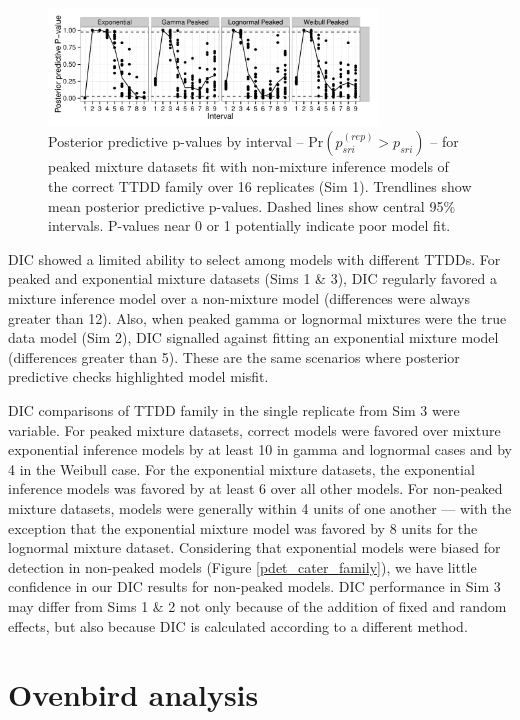 \documentclass[useAMS,usenatbib,referee,12pt]{article}
\begin{document}
\begin{figure}[h!]\centering
\includegraphics[width=0.78\textwidth]{Sims/SimZero/PostPredP_corr.pdf}
\caption{\label{postpredmix} Posterior predictive p-values by interval -- Pr$\left(p_{sri}^{(rep)} > p_{sri}\right)$ -- for peaked mixture datasets fit with non-mixture inference models of the correct TTDD family over 16 replicates (Sim 1).  Trendlines show mean posterior predictive p-values.  Dashed lines show central 95\% intervals.  P-values near 0 or 1 potentially indicate poor model fit.}
\end{figure}

DIC showed a limited ability to select among models with different TTDDs.  For peaked and exponential mixture datasets (Sims 1 \& 3), DIC regularly favored a mixture inference model over a non-mixture model (differences were always greater than 12).  Also, when peaked gamma or lognormal mixtures were the true data model (Sim 2), DIC signalled against fitting an exponential mixture model (differences greater than 5).  These are the same scenarios where posterior predictive checks highlighted model misfit.

DIC comparisons of TTDD family in the single replicate from Sim 3 were variable.  For peaked mixture datasets, correct models were favored over mixture exponential inference models by at least 10 in gamma and lognormal cases and by 4 in the Weibull case.  For the exponential mixture datasets, the exponential inference models was favored by at least 6 over all other models.  For non-peaked mixture datasets, models were generally within 4 units of one another --- with the exception that the exponential mixture model was favored by 8 units for the lognormal mixture dataset.  Considering that exponential models were biased for detection in non-peaked models (Figure \ref{pdet_cater_family}), we have little confidence in our DIC results for non-peaked models.  DIC performance in Sim 3 may differ from Sims 1 \& 2 not only because of the addition of fixed and random effects, but also because DIC is calculated according to a different method.


\section{Ovenbird analysis}
\end{document}
